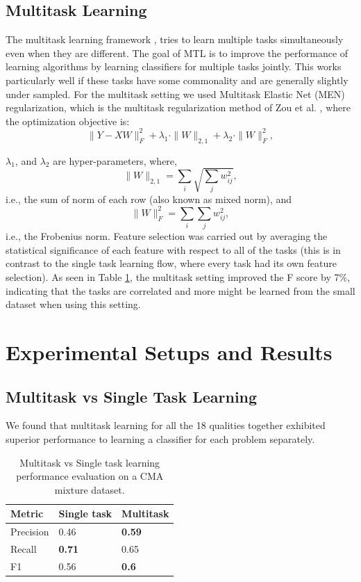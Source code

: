 \documentclass[11pt,twocolumn,varwidth=true,a4paper,fleqn]{sigchi}
\begin{document}
\subsection{Multitask Learning}
The multitask learning framework \cite{caruana1997multitask},  tries to learn multiple tasks simultaneously even
when they are different. The goal of MTL is to improve the performance of learning algorithms by learning
classifiers for multiple tasks jointly. This works particularly well if these tasks have some commonality and
are generally slightly under sampled.
For the multitask setting we used Multitask Elastic Net (MEN) regularization, which is
the multitask regularization method of Zou et al. \cite{Zou}, where the
optimization objective is:
\\
\begin{equation}\label{eq:MEN}
\|Y - XW\|^2_F+\lambda_1\cdot\|W\|_{2,1}+\lambda_2\cdot\|W\|^2_F,
\end{equation}

$\lambda_1$, and $\lambda_2$ are hyper-parameters, where,
\\
\begin{equation*}
\|W\|_{2,1} = \sum_i \sqrt{\sum_j w_{ij}^2},
\end{equation*}
i.e., the sum of norm of each row (also known as mixed norm), and
\begin{equation*}
\|W\|^2_F = \sum_i{\sum_j w_{ij}^2},
\end{equation*}
i.e., the Frobenius norm.
Feature selection was carried out by averaging the statistical significance of
each feature with respect to all of the tasks (this is in contrast to the single
task learning flow, where every task had its own feature selection). As seen in
Table \ref{MultitaskVsSeparated}, the multitask setting improved the F score by
7\%, indicating that the tasks are correlated and more might be learned
from the small dataset when using this setting.

\section{Experimental Setups and Results}
\subsection{Multitask vs Single Task Learning}
We found that multitask learning for all the 18 qualities together exhibited superior
performance to learning a classifier for each problem separately.
\begin{table}[ht]
\centering
\begin{tabular}{|p{1.8cm}|p{1.8cm}|p{1.8cm}|}
\hline
Metric&Single task&Multitask\\\hline
Precision&0.46&\textbf{0.59}\\\hline
Recall&\textbf{0.71}&0.65\\\hline
F1&0.56&\textbf{0.6}\\\hline
\end{tabular}
\caption{Multitask vs Single task learning performance evaluation on a CMA mixture
dataset.}
\label{MultitaskVsSeparated}
\end{table}
\end{document}
